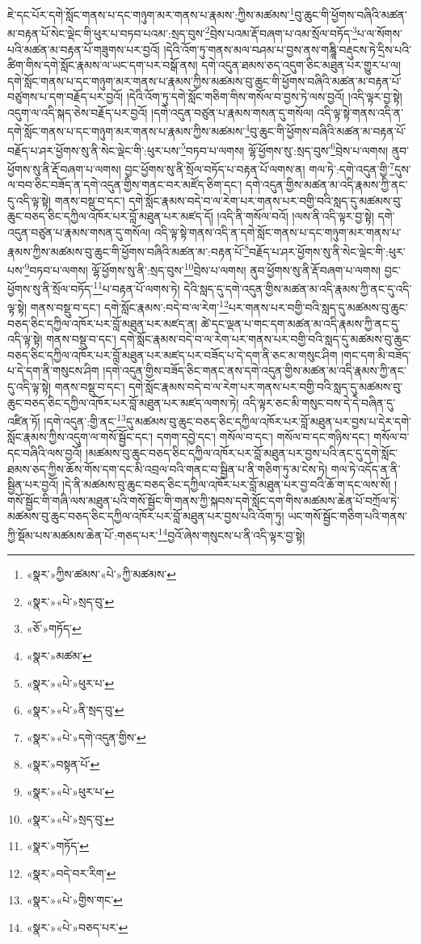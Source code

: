 ཇེ་དང་པོར་དགེ་སློང་གནས་པ་དང་གཉུག་མར་གནས་པ་རྣམས་:ཀྱིས་མཚམས་\footnote{«སྣར་»ཀྱིས་ཚམས་«པེ་»ཀྱི་མཚམས་}བུ་ཆུང་གི་ཕྱོགས་བཞིའི་མཚན་མ་བརྟན་པོ་སེང་ལྡེང་གི་ཕུར་པ་བཏབ་པའམ་:སྲད་བུས་\footnote{«སྣར་»«པེ་»སྲད་བུ་}བྲེས་པའམ་རྡོ་བཞག་པ་འམ་སྲོལ་བཏོད་\footnote{«ཅོ་»གཏོད་}པ་ལ་སོགས་པའི་མཚན་མ་བརྟན་པོ་གཟུགས་པར་བྱའོ། །དེའི་འོག་ཏུ་གནས་མལ་བཤམ་པ་བྱས་ནས་གཎྜཱི་བརྡུངས་ཏེ་དྲིས་པའི་ཚིག་གིས་དགེ་སློང་རྣམས་ལ་ཡང་དག་པར་བསྒོ་ནས། དགེ་འདུན་ཐམས་ཅད་འདུག་ཅིང་མཐུན་པར་གྱུར་པ་ལ། དགེ་སློང་གནས་པ་དང་གཉུག་མར་གནས་པ་རྣམས་ཀྱིས་མཚམས་བུ་ཆུང་གི་ཕྱོགས་བཞིའི་མཚན་མ་བརྟན་པོ་བཙུགས་པ་དག་བརྗོད་པར་བྱའོ། །དེའི་འོག་ཏུ་དགེ་སློང་གཅིག་གིས་གསོལ་བ་བྱས་ཏེ་ལས་བྱའོ། །འདི་ལྟར་བྱ་སྟེ། འདུག་ལ་འདི་སྐད་ཅེས་བརྗོད་པར་བྱའོ། །དགེ་འདུན་བཙུན་པ་རྣམས་གསན་དུ་གསོལ། འདི་ལྟ་སྟེ་གནས་འདི་ན་དགེ་སློང་གནས་པ་དང་གཉུག་མར་གནས་པ་རྣམས་ཀྱིས་མཚམས་\footnote{«སྣར་»མཚམ་}བུ་ཆུང་གི་ཕྱོགས་བཞིའི་མཚན་མ་བརྟན་པོ་བརྗོད་པ་ཤར་ཕྱོགས་སུ་ནི་སེང་ལྡེང་གི་:ཕུར་པས་\footnote{«སྣར་»«པེ་»ཕུར་པ་}བཏབ་པ་ལགས། ལྷོ་ཕྱོགས་སུ་:སྲད་བུས་\footnote{«སྣར་»«པེ་»ནི་སྲད་བུ་}བྲེས་པ་ལགས། ནུབ་ཕྱོགས་སུ་ནི་རྡོ་བཞག་པ་ལགས། བྱང་ཕྱོགས་སུ་ནི་སྲོལ་བཏོད་པ་བརྟན་པོ་ལགས་ན། གལ་ཏེ་:དགེ་འདུན་གྱི་\footnote{«སྣར་»«པེ་»དགེ་འདུན་གྱིས་}དུས་ལ་བབ་ཅིང་བཟོད་ན་དགེ་འདུན་གྱིས་གནང་བར་མཛོད་ཅིག་དང་། དགེ་འདུན་གྱིས་མཚན་མ་འདི་རྣམས་ཀྱི་ནང་དུ་འདི་ལྟ་སྟེ། གནས་བསྡུ་བ་དང་། དགེ་སློང་རྣམས་བདེ་བ་ལ་རེག་པར་གནས་པར་བགྱི་བའི་སླད་དུ་མཚམས་བུ་ཆུང་བཅད་ཅིང་དཀྱིལ་འཁོར་པར་བློ་མཐུན་པར་མཛད་དོ། །འདི་ནི་གསོལ་བའོ། །ལས་ནི་འདི་ལྟར་བྱ་སྟེ། དགེ་འདུན་བཙུན་པ་རྣམས་གསན་དུ་གསོལ། འདི་ལྟ་སྟེ་གནས་འདི་ན་དགེ་སློང་གནས་པ་དང་གཉུག་མར་གནས་པ་རྣམས་ཀྱིས་མཚམས་བུ་ཆུང་གི་ཕྱོགས་བཞིའི་མཚན་མ་:བརྟན་པོ་\footnote{«སྣར་»བསྟན་པོ་}བརྗོད་པ་ཤར་ཕྱོགས་སུ་ནི་སེང་ལྡེང་གི་:ཕུར་པས་\footnote{«སྣར་»«པེ་»ཕུར་པ་}བཏབ་པ་ལགས། ལྷོ་ཕྱོགས་སུ་ནི་:སྲད་བུས་\footnote{«སྣར་»«པེ་»སྲད་བུ་}བྲེས་པ་ལགས། ནུབ་ཕྱོགས་སུ་ནི་རྡོ་བཞག་པ་ལགས། བྱང་ཕྱོགས་སུ་ནི་སྲོལ་བཏོད་\footnote{«སྣར་»གཏོད་}པ་བརྟན་པོ་ལགས་ཏེ། དེའི་སླད་དུ་དགེ་འདུན་གྱིས་མཚན་མ་འདི་རྣམས་ཀྱི་ནང་དུ་འདི་ལྟ་སྟེ། གནས་བསྡུ་བ་དང་། དགེ་སློང་རྣམས་:བདེ་བ་ལ་རེག་\footnote{«སྣར་»བདེ་བར་རིག་}པར་གནས་པར་བགྱི་བའི་སླད་དུ་མཚམས་བུ་ཆུང་བཅད་ཅིང་དཀྱིལ་འཁོར་པར་བློ་མཐུན་པར་མཛད་ན། ཚེ་དང་ལྡན་པ་གང་དག་མཚན་མ་འདི་རྣམས་ཀྱི་ནང་དུ་འདི་ལྟ་སྟེ། གནས་བསྡུ་བ་དང་། དགེ་སློང་རྣམས་བདེ་བ་ལ་རེག་པར་གནས་པར་བགྱི་བའི་སླད་དུ་མཚམས་བུ་ཆུང་བཅད་ཅིང་དཀྱིལ་འཁོར་པར་བློ་མཐུན་པར་མཛད་པར་བཟོད་པ་དེ་དག་ནི་ཅང་མ་གསུང་ཤིག །གང་དག་མི་བཟོད་པ་དེ་དག་ནི་གསུངས་ཤིག །དགེ་འདུན་གྱིས་བཟོད་ཅིང་གནང་ནས་དགེ་འདུན་གྱིས་མཚན་མ་འདི་རྣམས་ཀྱི་ནང་དུ་འདི་ལྟ་སྟེ། གནས་བསྡུ་བ་དང་། དགེ་སློང་རྣམས་བདེ་བ་ལ་རེག་པར་གནས་པར་བགྱི་བའི་སླད་དུ་མཚམས་བུ་ཆུང་བཅད་ཅིང་དཀྱིལ་འཁོར་པར་བློ་མཐུན་པར་མཛད་ལགས་ཏེ། འདི་ལྟར་ཅང་མི་གསུང་བས་དེ་དེ་བཞིན་དུ་འཛིན་ཏོ། །དགེ་འདུན་:གྱི་ནང་\footnote{«སྣར་»«པེ་»གྱིས་གང་}དུ་མཚམས་བུ་ཆུང་བཅད་ཅིང་དཀྱིལ་འཁོར་པར་བློ་མཐུན་པར་བྱས་པ་དེར་དགེ་སློང་རྣམས་ཀྱིས་འདུག་ལ་གསོ་སྦྱོང་དང་། དགག་དབྱེ་དང་། གསོལ་བ་དང་། གསོལ་བ་དང་གཉིས་དང་། གསོལ་བ་དང་བཞིའི་ལས་བྱའོ། །མཚམས་བུ་ཆུང་བཅད་ཅིང་དཀྱིལ་འཁོར་པར་བློ་མཐུན་པར་བྱས་པའི་ནང་དུ་དགེ་སློང་ཐམས་ཅད་ཀྱིས་ཆོས་གོས་དག་དང་མི་འབྲལ་བའི་གནང་བ་སྦྱིན་པ་ནི་གཅིག་ཏུ་མ་ངེས་ཏེ། གལ་ཏེ་འདོད་ན་ནི་སྦྱིན་པར་བྱའོ། །དེ་ནི་མཚམས་བུ་ཆུང་བཅད་ཅིང་དཀྱིལ་འཁོར་པར་བློ་མཐུན་པར་བྱ་བའི་ཆོ་ག་དང་ལས་སོ། །གསོ་སྦྱོང་གི་གཞི་ལས་མཐུན་པའི་གསོ་སྦྱོང་གི་གནས་ཀྱི་སྐབས་དགེ་སློང་དག་གིས་མཚམས་ཆེན་པོ་བཀྲོལ་ཏེ་མཚམས་བུ་ཆུང་བཅད་ཅིང་དཀྱིལ་འཁོར་པར་བློ་མཐུན་པར་བྱས་པའི་འོག་ཏུ། ཡང་གསོ་སྦྱོང་གཅིག་པའི་གནས་ཀྱི་སྡོམ་པས་མཚམས་ཆེན་པོ་:གཅད་པར་\footnote{«སྣར་»«པེ་»བཅད་པར་}བྱའོ་ཞེས་གསུངས་པ་ནི་འདི་ལྟར་བྱ་སྟེ། 